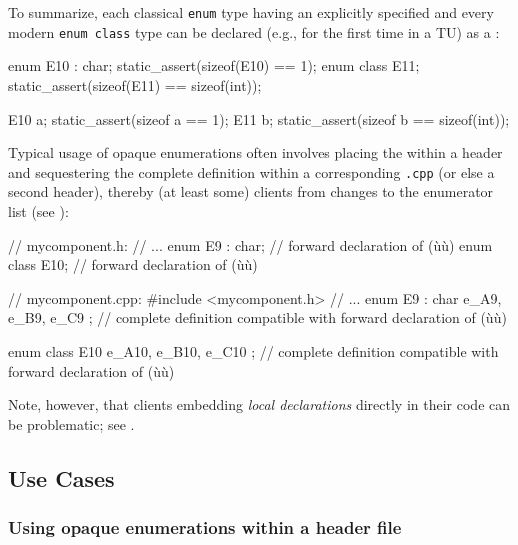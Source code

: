 \noindent To summarize, each classical \lstinline!enum! type having an explicitly
specified  and every modern \lstinline!enum!~\lstinline!class! type can be declared (e.g., for the first
time in a TU) as a :

\begin{emcppslisting}[emcppsbatch=e1]
enum E10 : char;  static_assert(sizeof(E10)  == 1);
enum class E11;   static_assert(sizeof(E11) == sizeof(int));

E10 a;            static_assert(sizeof a == 1);
E11 b;            static_assert(sizeof b == sizeof(int));
\end{emcppslisting}

\noindent Typical usage of opaque enumerations often involves placing the
 within a header and sequestering the
complete definition within a corresponding \lstinline!.cpp! (or else a
second header), thereby  (at least some) clients from
changes to the enumerator list (see ):

\begin{emcppslisting}
// mycomponent.h:
// ...
enum E9 : char;   // forward declaration of (ù{}ù)
enum class E10;   // forward declaration of (ù{}ù)


// mycomponent.cpp:
#include <mycomponent.h>
// ...
enum E9 : char { e_A9, e_B9, e_C9 };
    // complete definition compatible with forward declaration of (ù{}ù)

enum class E10 { e_A10, e_B10, e_C10 };
    // complete definition compatible with forward declaration of (ù{}ù)
\end{emcppslisting}

\noindent Note, however, that clients embedding \emph{local declarations} directly
in their code can be problematic; see .

\subsection[Use Cases]{Use Cases}\label{use-cases-opaqueenum}

\subsubsection[Using opaque enumerations within a header file]{Using opaque enumerations within a header file}\label{using-opaque-enumerations-within-a-header-file}

